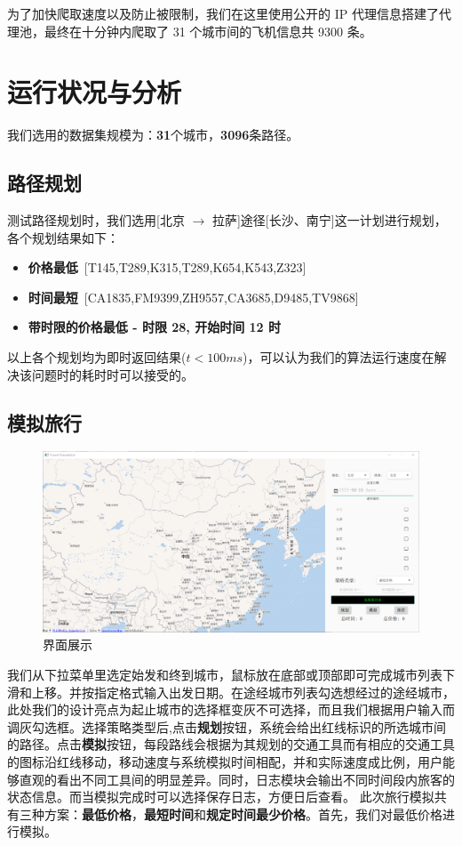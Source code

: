 \documentclass[lang=cn,blue,14pt]{elegantbook}
\begin{document}
为了加快爬取速度以及防止被限制，我们在这里使用公开的 IP 代理信息搭建了代理池，最终在十分钟内爬取了 31 个城市间的飞机信息共 9300 条。

\chapter{运行状况与分析}
我们选用的数据集规模为：\textbf{31}个城市，\textbf{3096}条路径。

\section{路径规划}
测试路径规划时，我们选用[北京 $\to$ 拉萨]途径[长沙、南宁]这一计划进行规划，各个规划结果如下：

\begin{itemize}
	\item \textbf{价格最低}\ [T145,T289,K315,T289,K654,K543,Z323]
	\item \textbf{时间最短}\ [CA1835,FM9399,ZH9557,CA3685,D9485,TV9868]
	\item \textbf{带时限的价格最低 - 时限 28, 开始时间 12 时}\newline [CZ3128,CZ3130,D3634,ZH3886,3U8936,CZ8165]
\end{itemize}

以上各个规划均为即时返回结果($t < 100ms$)，可以认为我们的算法运行速度在解决该问题时的耗时时可以接受的。

\section{模拟旅行}

\begin{figure}[!htbp]
	\centering
	\includegraphics[width=1\textwidth]{beforestart.png}
	\caption{界面展示}
	\label{beforestart}
\end{figure}

我们从下拉菜单里选定始发和终到城市，鼠标放在底部或顶部即可完成城市列表下滑和上移。并按指定格式输入出发日期。在途经城市列表勾选想经过的途经城市，此处我们的设计亮点为起止城市的选择框变灰不可选择，而且我们根据用户输入而调灰勾选框。选择策略类型后,点击\textbf{规划}按钮，系统会给出红线标识的所选城市间的路径。点击\textbf{模拟}按钮，每段路线会根据为其规划的交通工具而有相应的交通工具的图标沿红线移动，移动速度与系统模拟时间相配，并和实际速度成比例，用户能够直观的看出不同工具间的明显差异。同时，日志模块会输出不同时间段内旅客的状态信息。而当模拟完成时可以选择保存日志，方便日后查看。
此次旅行模拟共有三种方案：\textbf{最低价格}，\textbf{最短时间}和\textbf{规定时间最少价格}。首先，我们对最低价格进行模拟。
\end{document}
